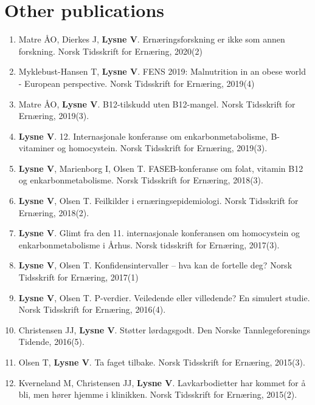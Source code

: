 \documentclass[11pt, a4paper]{awesome-cv}
\providecommand{\tightlist}{%
	\setlength{\itemsep}{0pt}\setlength{\parskip}{0pt}}
\begin{document}
\hypertarget{other-publications}{%
\section{Other publications}\label{other-publications}}

\begin{enumerate}
\def\labelenumi{\arabic{enumi}.}
\tightlist
\item
  Matre ÅO, Dierkes J, \textbf{Lysne V}. Ernæringsforskning er ikke som
  annen forskning. Norsk Tidsskrift for Ernæring, 2020(2)
\item
  Myklebust-Hansen T, \textbf{Lysne V}. FENS 2019: Malnutrition in an
  obese world - European perspective. Norsk Tidsskrift for Ernæring,
  2019(4)
\item
  Matre ÅO, \textbf{Lysne V}. B12-tilskudd uten B12-mangel. Norsk
  Tidsskrift for Ernæring, 2019(3).
\item
  \textbf{Lysne V}. 12. Internasjonale konferanse om
  enkarbonmetabolisme, B-vitaminer og homocystein. Norsk Tidsskrift for
  Ernæring, 2019(3).
\item
  \textbf{Lysne V}, Marienborg I, Olsen T. FASEB-konferanse om folat,
  vitamin B12 og enkarbonmetabolisme. Norsk Tidsskrift for Ernæring,
  2018(3).
\item
  \textbf{Lysne V}, Olsen T. Feilkilder i ernæringsepidemiologi. Norsk
  Tidsskrift for Ernæring, 2018(2).
\item
  \textbf{Lysne V}. Glimt fra den 11. internasjonale konferansen om
  homocystein og enkarbonmetabolisme i Århus. Norsk tidsskrift for
  Ernæring, 2017(3).
\item
  \textbf{Lysne V}, Olsen T. Konfidensintervaller -- hva kan de fortelle
  deg? Norsk Tidsskrift for Ernæring, 2017(1)
\item
  \textbf{Lysne V}, Olsen T. P-verdier. Veiledende eller villedende? En
  simulert studie. Norsk Tidsskrift for Ernæring, 2016(4).
\item
  Christensen JJ, \textbf{Lysne V}. Støtter lørdagsgodt. Den Norske
  Tannlegeforenings Tidende, 2016(5).
\item
  Olsen T, \textbf{Lysne V}. Ta faget tilbake. Norsk Tidsskrift for
  Ernæring, 2015(3).
\item
  Kverneland M, Christensen JJ, \textbf{Lysne V}. Lavkarbodietter har
  kommet for å bli, men hører hjemme i klinikken. Norsk Tidsskrift for
  Ernæring, 2015(2).
\end{enumerate}

\newpage
\end{document}
